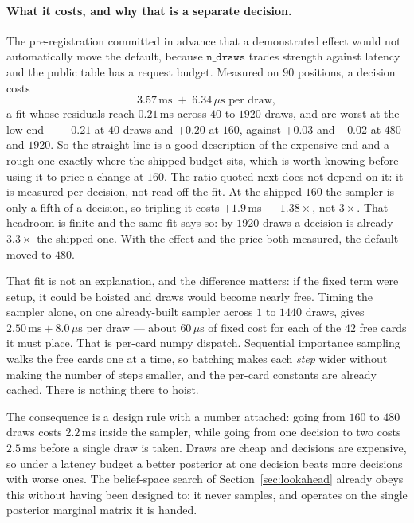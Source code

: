 \documentclass[11pt,a4paper]{article}
\begin{document}
\paragraph{What it costs, and why that is a separate decision.} The
pre-registration committed in advance that a demonstrated effect would not
automatically move the default, because $\texttt{n\_draws}$ trades strength
against latency and the public table has a request budget. Measured on $90$
positions, a decision costs
\[
  3.57\,\mathrm{ms} \;+\; 6.34\,\mu\mathrm{s} \text{ per draw},
\]
a fit whose residuals reach $0.21$\,ms across $40$ to $1920$ draws, and are
worst at the low end --- $-0.21$ at $40$ draws and $+0.20$ at $160$, against
$+0.03$ and $-0.02$ at $480$ and $1920$. So the straight line is a good
description of the expensive end and a rough one exactly where the shipped
budget sits, which is worth knowing before using it to price a change at $160$.
The ratio quoted next does not depend on it: it is measured per decision, not
read off the fit. At the
shipped $160$ the sampler is only a fifth of a decision, so tripling it costs
$+1.9$\,ms --- $1.38\times$, not $3\times$. That headroom is finite and the same
fit says so: by $1920$ draws a decision is already $3.3\times$ the shipped one.
With the effect and the price both measured, the default moved to $480$.

That fit is not an explanation, and the difference matters: if the fixed term
were setup, it could be hoisted and draws would become nearly free. Timing the
sampler alone, on one already-built sampler across $1$ to $1440$ draws, gives
$2.50\,\mathrm{ms} + 8.0\,\mu\mathrm{s}$ per draw --- about $60\,\mu$s of fixed
cost for each of the $42$ free cards it must place. That is per-card numpy
dispatch. Sequential importance sampling walks the free cards one at a time, so
batching makes each \emph{step} wider without making the number of steps
smaller, and the per-card constants are already cached. There is nothing there to
hoist.

The consequence is a design rule with a number attached: going from $160$ to
$480$ draws costs $2.2$\,ms inside the sampler, while going from one decision to
two costs $2.5$\,ms before a single draw is taken. Draws are cheap and decisions
are expensive, so under a latency budget a better posterior at one decision beats
more decisions with worse ones. The belief-space search of
Section~\ref{sec:lookahead} already obeys this without having been designed to: it
never samples, and operates on the single posterior marginal matrix it is handed.
\end{document}
